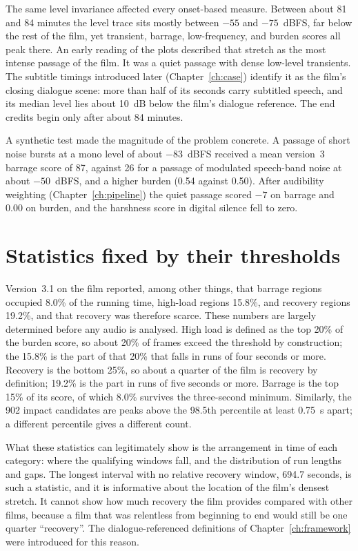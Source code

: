 The same level invariance affected every onset-based measure. Between about 81 and 84 minutes the level trace sits mostly between $-55$ and $-75$~dBFS, far below the rest of the film, yet transient, barrage, low-frequency, and burden scores all peak there. An early reading of the plots described that stretch as the most intense passage of the film. It was a quiet passage with dense low-level transients. The subtitle timings introduced later (Chapter~\ref{ch:case}) identify it as the film's closing dialogue scene: more than half of its seconds carry subtitled speech, and its median level lies about 10~dB below the film's dialogue reference. The end credits begin only after about 84 minutes.

A synthetic test made the magnitude of the problem concrete. A passage of short noise bursts at a mono level of about $-83$~dBFS received a mean version~3 barrage score of 87, against 26 for a passage of modulated speech-band noise at about $-50$~dBFS, and a higher burden (0.54 against 0.50). After audibility weighting (Chapter~\ref{ch:pipeline}) the quiet passage scored $-7$ on barrage and 0.00 on burden, and the harshness score in digital silence fell to zero.

\section{Statistics fixed by their thresholds}

Version~3.1 on the film reported, among other things, that barrage regions occupied 8.0\% of the running time, high-load regions 15.8\%, and recovery regions 19.2\%, and that recovery was therefore scarce. These numbers are largely determined before any audio is analysed. High load is defined as the top 20\% of the burden score, so about 20\% of frames exceed the threshold by construction; the 15.8\% is the part of that 20\% that falls in runs of four seconds or more. Recovery is the bottom 25\%, so about a quarter of the film is recovery by definition; 19.2\% is the part in runs of five seconds or more. Barrage is the top 15\% of its score, of which 8.0\% survives the three-second minimum. Similarly, the 902 impact candidates are peaks above the 98.5th percentile at least 0.75~s apart; a different percentile gives a different count.

What these statistics can legitimately show is the arrangement in time of each category: where the qualifying windows fall, and the distribution of run lengths and gaps. The longest interval with no relative recovery window, 694.7 seconds, is such a statistic, and it is informative about the location of the film's densest stretch. It cannot show how much recovery the film provides compared with other films, because a film that was relentless from beginning to end would still be one quarter ``recovery''. The dialogue-referenced definitions of Chapter~\ref{ch:framework} were introduced for this reason.

